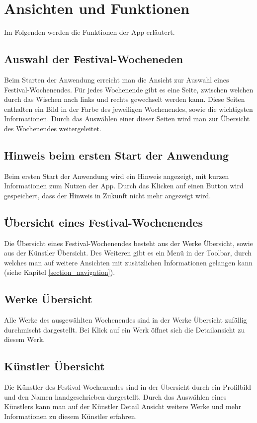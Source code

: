 \section{Ansichten und Funktionen}
Im Folgenden werden die Funktionen der App erläutert. 

\subsection{Auswahl der Festival-Wocheneden}
Beim Starten der Anwendung erreicht man die Ansicht zur Auswahl eines Festival-Wochenendes. Für jedes Wochenende gibt es eine Seite, zwischen welchen durch das Wischen nach links und rechts gewechselt werden kann. Diese Seiten enthalten ein Bild in der Farbe des jeweiligen Wochenendes, sowie die wichtigsten Informationen. Durch das Auswählen einer dieser Seiten wird man zur Übersicht des Wochenendes weitergeleitet.

\subsection{Hinweis beim ersten Start der Anwendung}
Beim ersten Start der Anwendung wird ein Hinweis angezeigt, mit kurzen Informationen zum Nutzen der App. Durch das Klicken auf einen Button wird gespeichert, dass der Hinweis in Zukunft nicht mehr angezeigt wird.

\subsection{Übersicht eines Festival-Wochenendes}
Die Übersicht eines Festival-Wochenendes besteht aus der Werke Übersicht, sowie aus der Künstler Übersicht. Des Weiteren gibt es ein Menü in der Toolbar, durch welches man auf weitere Ansichten mit zusätzlichen Informationen gelangen kann (siehe Kapitel \ref{section_navigation}).

\subsection{Werke Übersicht}
Alle Werke des ausgewählten Wochenendes sind in der Werke Übersicht zufällig durchmischt dargestellt. Bei Klick auf ein Werk öffnet sich die Detailansicht zu diesem Werk.

\subsection{Künstler Übersicht}
Die Künstler des Festival-Wochenendes sind in der Übersicht durch ein Profilbild und den Namen handgeschrieben dargestellt. Durch das Auswählen eines Künstlers kann man auf der Künstler Detail Ansicht weitere Werke und mehr Informationen zu diesem Künstler erfahren.


